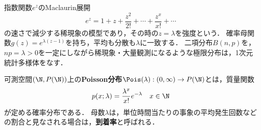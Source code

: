 \documentclass[uplatex,dvipdfmx]{jsreport}
\begin{document}
\begin{tcolorbox}[colframe=ForestGreen, colback=ForestGreen!10!white,breakable,colbacktitle=ForestGreen!40!white,coltitle=black,fonttitle=\bfseries\sffamily,
title=]
    指数関数$e^{z}$のMaclaurin展開
    \[e^{z}=1+z+\frac{z^2}{2!}+\cdots+\frac{z^x}{x!}+\cdots\]
    の速さで減少する稀現象の模型であり，その時の$z=\lambda$を強度という．
    確率母関数$g(z)=e^{\lambda(z-1)}$を持ち，平均も分散も$\lambda$に一致する．
    二項分布$B(n,p)$を，$np=\lambda>0$を一定にしながら稀現象・大量観測になるような極限分布は，1次元統計多様体をなす．
\end{tcolorbox}

\begin{definition}
    可測空間$(\N,P(\N))$上の\textbf{Poisson分布}$\Pois(\lambda):(0,\infty)\to P(\N)$とは，質量関数
    \[p(x;\lambda)=\frac{\lambda^x}{x!}e^{-\lambda}\quad x\in\N\]
    が定める確率分布である．
    母数$\lambda$は，単位時間当たりの事象の平均発生回数などの割合と見なされる場合は，\textbf{到着率}と呼ばれる．
\end{definition}
\end{document}
